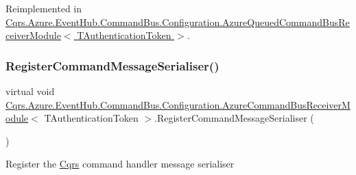 Reimplemented in \hyperlink{classCqrs_1_1Azure_1_1EventHub_1_1CommandBus_1_1Configuration_1_1AzureQueuedCommandBusReceiverModule_a30d8ea5555bbb38bfddc6b5aa1e3dd1c}{Cqrs.\+Azure.\+Event\+Hub.\+Command\+Bus.\+Configuration.\+Azure\+Queued\+Command\+Bus\+Receiver\+Module$<$ T\+Authentication\+Token $>$}.

\mbox{\label{classCqrs_1_1Azure_1_1EventHub_1_1CommandBus_1_1Configuration_1_1AzureCommandBusReceiverModule_a03805080424e87926083c35d45ffc550}} 
\subsubsection{\texorpdfstring{Register\+Command\+Message\+Serialiser()}{RegisterCommandMessageSerialiser()}}
{\footnotesize\ttfamily virtual void \hyperlink{classCqrs_1_1Azure_1_1EventHub_1_1CommandBus_1_1Configuration_1_1AzureCommandBusReceiverModule}{Cqrs.\+Azure.\+Event\+Hub.\+Command\+Bus.\+Configuration.\+Azure\+Command\+Bus\+Receiver\+Module}$<$ T\+Authentication\+Token $>$.Register\+Command\+Message\+Serialiser (\begin{DoxyParamCaption}{ }\end{DoxyParamCaption})\hspace{0.3cm}{\ttfamily [virtual]}}



Register the \hyperlink{namespaceCqrs}{Cqrs} command handler message serialiser 


